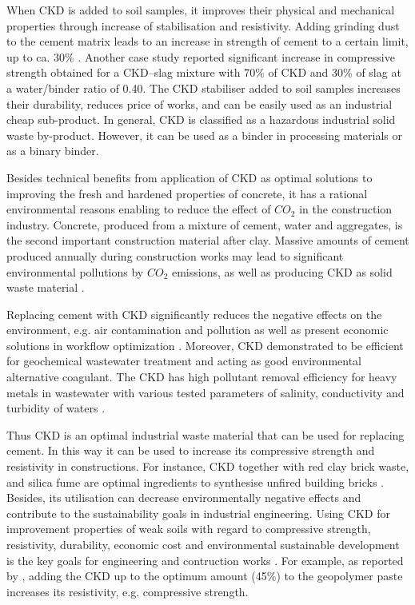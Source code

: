 \documentclass[a4paper,fleqn]{cas-dc}
\begin{document}
When CKD is added to soil samples, it improves their physical and mechanical properties through increase of stabilisation and resistivity. Adding grinding dust to the cement matrix leads to an increase in strength of cement to a certain limit, up to ca. 30\% \citep{RIBEIRO20093094}. Another case study \citep{CHAUNSALI2011197} reported significant increase in compressive strength obtained for a CKD–slag mixture with 70\% of CKD and 30\% of slag at a water/binder ratio of 0.40. The CKD stabiliser added to soil samples increases their durability, reduces price of works, and can be easily used as an industrial cheap sub-product. In general, CKD is classified as a hazardous industrial solid waste by-product. However, it can be used as a binder in processing materials or as a binary binder.

Besides technical benefits from application of CKD as optimal solutions to improving the fresh and hardened properties of concrete, it has a rational environmental reasons enabling to reduce the effect of $CO_2$ in the construction industry. Concrete, produced from a mixture of cement, water and aggregates, is the second important construction material after clay. 
Massive amounts of cement produced annually during construction works may lead to significant environmental pollutions by $CO_2$ emissions, as well as producing CKD as solid waste material \citep{NAJIM20145}. 

Replacing cement with CKD significantly reduces the negative effects on the environment, e.g. air contamination and pollution \citep{BAGHERI2020101809} as well as present economic solutions in workflow optimization \citep{FAISAL2021105194}. Moreover, CKD demonstrated to be efficient for geochemical wastewater treatment and acting as good environmental alternative coagulant. The CKD has high pollutant removal efficiency for heavy metals in wastewater with various tested parameters of salinity, conductivity and turbidity of waters \citep{HASABALLAH2021}. 

Thus CKD is an optimal industrial waste material that can be used for replacing cement. In this way it can be used to increase its compressive strength and resistivity in constructions. For instance, CKD together with red clay brick waste, and silica fume are optimal ingredients to synthesise unfired building bricks \cite{ABDELGAWWAD20191218}. Besides, its utilisation can decrease environmentally negative effects and contribute to the sustainability goals in industrial engineering. Using CKD for improvement properties of weak soils with regard to compressive strength, resistivity, durability, economic cost and environmental sustainable development is the key goals for engineering and contruction works \citep{ALHOMIDY2017749}. For example, as reported by \citep{YASERI2019592}, adding the CKD up to the optimum amount (45\%) to the geopolymer paste increases its resistivity, e.g. compressive strength. 
\end{document}
